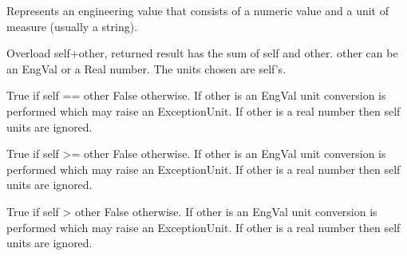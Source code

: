 \documentclass[letterpaper,10pt,english]{sphinxmanual}
\begin{document}
\begin{fulllineitems}
\label{\detokenize{ref/LIS/core/EngVal:TotalDepth.LIS.core.EngVal.EngVal}}
Represents an engineering value that consists of a numeric value and a
unit of measure (usually a string).

\begin{fulllineitems}
\label{\detokenize{ref/LIS/core/EngVal:TotalDepth.LIS.core.EngVal.EngVal.__add__}}
Overload self+other, returned result has the sum of self and other.
other can be an EngVal or a Real number.
The units chosen are self’s.

\end{fulllineitems}


\begin{fulllineitems}
\label{\detokenize{ref/LIS/core/EngVal:TotalDepth.LIS.core.EngVal.EngVal.__eq__}}
True if self == other False otherwise.
If other is an EngVal unit conversion is performed which may raise an ExceptionUnit.
If other is a real number then self units are ignored.

\end{fulllineitems}


\begin{fulllineitems}
\label{\detokenize{ref/LIS/core/EngVal:TotalDepth.LIS.core.EngVal.EngVal.__ge__}}
True if self \textgreater{}= other False otherwise.
If other is an EngVal unit conversion is performed which may raise an ExceptionUnit.
If other is a real number then self units are ignored.

\end{fulllineitems}


\begin{fulllineitems}
\label{\detokenize{ref/LIS/core/EngVal:TotalDepth.LIS.core.EngVal.EngVal.__gt__}}
True if self \textgreater{} other False otherwise.
If other is an EngVal unit conversion is performed which may raise an ExceptionUnit.
If other is a real number then self units are ignored.


\end{fulllineitems}
\end{fulllineitems}
\end{document}
